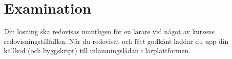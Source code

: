 \section{Examination}
\label{sec:Examination}
\noindent
Din lösning ska redovisas muntligen för en lärare vid något av kursens 
redovisningstillfällen.
När du redovisat och fått godkänt laddar du upp din källkod (och byggskript) 
till inlämningslådan i lärplattformen.
